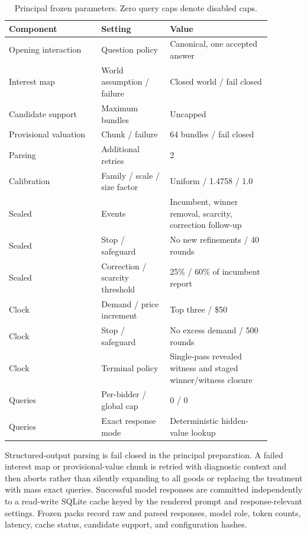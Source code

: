 \begin{table}[htbp]
\centering
\small
\caption{Principal frozen parameters. Zero query caps denote disabled caps.}
\label{tab:frozen-parameters}
\begin{tabular}{@{}p{0.31\linewidth}p{0.23\linewidth}p{0.34\linewidth}@{}}
\toprule
Component & Setting & Value \\
\midrule
Opening interaction & Question policy & Canonical, one accepted answer \\
Interest map & World assumption / failure & Closed world / fail closed \\
Candidate support & Maximum bundles & Uncapped \\
Provisional valuation & Chunk / failure & 64 bundles / fail closed \\
Parsing & Additional retries & 2 \\
Calibration & Family / scale / size factor & Uniform / 1.4758 / 1.0 \\
Sealed & Events & Incumbent, winner removal, scarcity, correction follow-up \\
Sealed & Stop / safeguard & No new refinements / 40 rounds \\
Sealed & Correction / scarcity threshold & 25\% / 60\% of incumbent report \\
Clock & Demand / price increment & Top three / \$50 \\
Clock & Stop / safeguard & No excess demand / 500 rounds \\
Clock & Terminal policy & Single-pass revealed witness and staged winner/witness closure \\
Queries & Per-bidder / global cap & 0 / 0 \\
Queries & Exact response mode & Deterministic hidden-value lookup \\
\bottomrule
\end{tabular}
\end{table}

Structured-output parsing is fail closed in the principal preparation. A
failed interest map or provisional-value chunk is retried with diagnostic
context and then aborts rather than silently expanding to all goods or
replacing the treatment with mass exact queries. Successful model responses
are committed independently to a read-write SQLite cache keyed by the rendered
prompt and response-relevant settings. Frozen packs record raw and parsed
responses, model role, token counts, latency, cache status, candidate support,
and configuration hashes.

